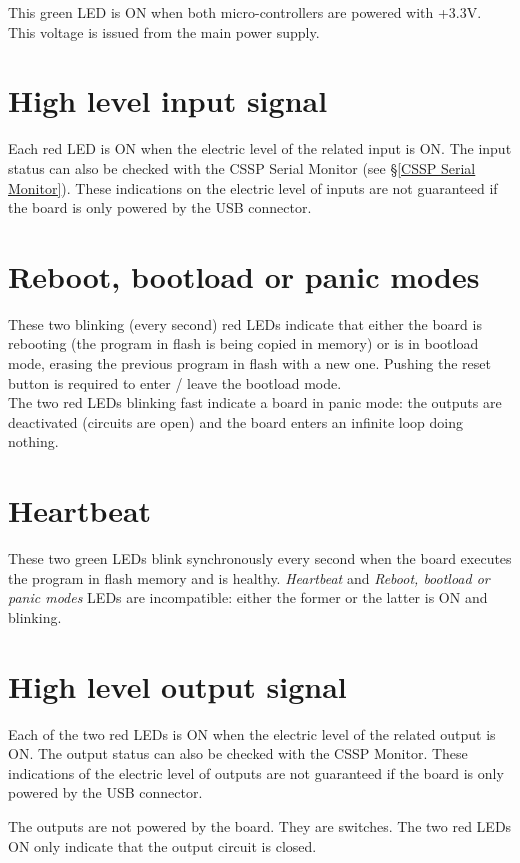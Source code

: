 This green LED is ON when both micro-controllers are powered with +3.3V. This voltage is issued from the main power supply. 

\section{High level input signal}

Each red LED is ON when the electric level of the related input is ON. The input status can also be checked with the CSSP Serial Monitor (see §\ref{CSSP Serial Monitor}).
These indications on the electric level of inputs are not guaranteed if the board is only powered by the USB connector.

\section{Reboot, bootload or panic modes}

These two blinking (every second) red LEDs indicate that either the board is rebooting (the program in flash is being copied in memory) or is in bootload mode, erasing the previous program in flash with a new one. Pushing the reset button is required to enter / leave the bootload mode.  \\
The two red LEDs blinking fast indicate a board in panic mode: the outputs are deactivated (circuits are open) and the board enters an infinite loop doing nothing.

\section{Heartbeat}

These two green LEDs blink synchronously every second when the board executes the program in flash memory and is healthy.
\textit{Heartbeat} and \textit{Reboot, bootload or panic modes} LEDs are incompatible: either the former or the latter is ON and blinking.

\section{High level output signal}

Each of the two red LEDs is ON when the electric level of the related output is ON. The output status can also be checked with the CSSP Monitor.
These indications of the electric level of outputs are not guaranteed if the board is only powered by the USB connector.

The outputs are not powered by the board. They are switches. The two red LEDs ON only indicate that the output circuit is closed.

